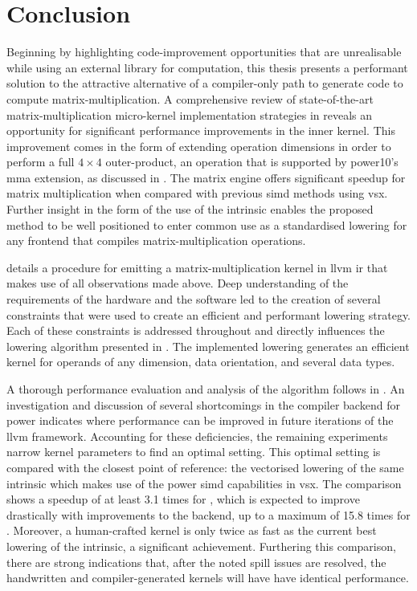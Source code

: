 \documentclass[\main/thesis.tex]{subfiles}
\begin{document}
\chapter{Conclusion}
\label{cha:conclusion}
Beginning by highlighting code-improvement opportunities that are unrealisable while using an external library for computation, this thesis presents a performant solution to the attractive alternative of a compiler-only path to generate code to compute matrix-multiplication.
A comprehensive review of state-of-the-art matrix-multiplication micro-kernel implementation strategies in  reveals an opportunity for significant performance improvements in the inner kernel.
This improvement comes in the form of extending operation dimensions in order to perform a full $4 \times 4$ outer-product, an operation that is supported by \gls{power10}'s \gls{mma} extension, as discussed in .
The \gls{matrix engine} offers significant speedup for matrix multiplication when compared with previous \gls{simd} methods using \gls{vsx}.
Further insight in the form of the use of the  intrinsic enables the proposed method to be well positioned to enter common use as a standardised \gls{lowering} for any frontend that compiles matrix-multiplication operations.

 details a procedure for emitting a matrix-multiplication kernel in \gls{llvm} \gls{ir} that makes use of all observations made above.
Deep understanding of the requirements of the hardware and the software led to the creation of several constraints that were used to create an efficient and performant \gls{lowering} strategy.
Each of these constraints is addressed throughout  and directly influences the \gls{lowering} algorithm presented in .
The implemented lowering generates an efficient kernel for operands of any dimension, data orientation, and several data types.

A thorough performance evaluation and analysis of the algorithm follows in .
An investigation and discussion of several shortcomings in the compiler backend for \gls{power} indicates where performance can be improved in future iterations of the \gls{llvm} framework.
Accounting for these deficiencies, the remaining experiments narrow kernel parameters to find an optimal setting.
This optimal setting is compared with the closest point of reference: the vectorised lowering of the same intrinsic which makes use of the \gls{power}  \gls{simd} capabilities in \gls{vsx}.
The comparison shows a speedup of at least 3.1 times for , which is expected to improve drastically with improvements to the backend, up to a maximum of 15.8 times for .
Moreover, a human-crafted kernel is only twice as fast as the current best \gls{lowering} of the  intrinsic, a significant achievement.
Furthering this comparison, there are strong indications that, after the noted spill issues are resolved, the handwritten and compiler-generated kernels will have have identical performance.
\end{document}
